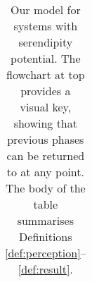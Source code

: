 \begin{table}[h]
{}

\begin{tabular}{p{}p{}}
\caption{Our model for systems with serendipity potential. The flowchart at top provides a visual key, showing that previous phases can be returned to at any point.  The body of the table summarises Definitions \ref{def:perception}--\ref{def:result}.\label{tab:model-summary-table}}
\end{tabular}
\end{table}
